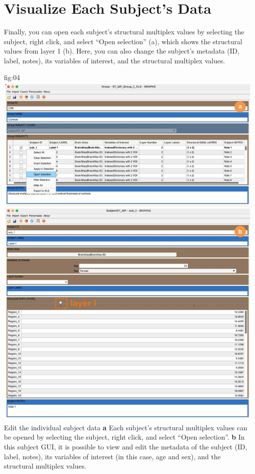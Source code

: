 \documentclass[justified]{tufte-handout}
\begin{document}
\section{Visualize Each Subject's Data}

Finally, you can open each subject's structural multiplex values by selecting the subject, right click, and select ``Open selection'' (a), which shows the structural values from layer 1 (b). Here, you can also change the subject's metadata (ID, label, notes), its variables of interest, and the structural multiplex values.

	{fig:04}
	{\includegraphics{fig04.jpg}
	}
	{Edit the individual subject data}
	{
	{\bf a}  Each subject's structural multiplex values can be opened by selecting the subject, right click, and select ``Open selection''.
	{\bf b} In this subject GUI, it is possible to view and edit the metadata of the subject (ID, label, notes), its variables of interest (in this case, age and sex), and the structural multiplex values. 
	}
\end{document}
